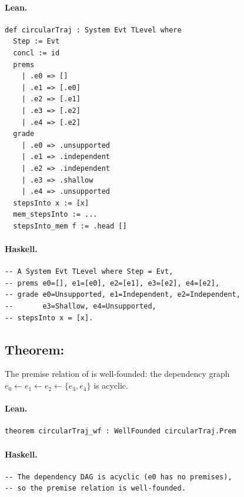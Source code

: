 \documentclass[11pt,a4paper]{article}
\begin{document}
\paragraph{Lean.}
\begin{lstlisting}[style=lean]
def circularTraj : System Evt TLevel where
  Step := Evt
  concl := id
  prems
    | .e0 => []
    | .e1 => [.e0]
    | .e2 => [.e1]
    | .e3 => [.e2]
    | .e4 => [.e2]
  grade
    | .e0 => .unsupported
    | .e1 => .independent
    | .e2 => .independent
    | .e3 => .shallow
    | .e4 => .unsupported
  stepsInto x := [x]
  mem_stepsInto := ...
  stepsInto_mem f := .head []
\end{lstlisting}

\paragraph{Haskell.}
\begin{lstlisting}[style=haskell]
-- A System Evt TLevel where Step = Evt,
-- prems e0=[], e1=[e0], e2=[e1], e3=[e2], e4=[e2],
-- grade e0=Unsupported, e1=Independent, e2=Independent,
--       e3=Shallow, e4=Unsupported,
-- stepsInto x = [x].
\end{lstlisting}


\subsection{Theorem: }

\begin{thm}
The premise relation of  is well-founded: the dependency
graph $e_0 \leftarrow e_1 \leftarrow e_2 \leftarrow \{e_3, e_4\}$ is acyclic.
\end{thm}

\paragraph{Lean.}
\begin{lstlisting}[style=lean]
theorem circularTraj_wf : WellFounded circularTraj.Prem
\end{lstlisting}

\paragraph{Haskell.}
\begin{lstlisting}[style=haskell]
-- The dependency DAG is acyclic (e0 has no premises),
-- so the premise relation is well-founded.
\end{lstlisting}
\end{document}
